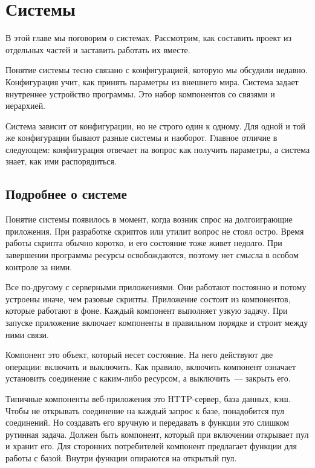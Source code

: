 \chapter{Системы}

\begin{teaser}
В этой главе мы поговорим о системах. Рассмотрим, как составить проект из
отдельных частей и заставить работать их вместе.
\end{teaser}


Понятие системы тесно связано с конфигурацией, которую мы обсудили
недавно. Конфигурация учит, как принять параметры из внешнего мира. Система
задает внутреннее устройство программы. Это набор компонентов со связями и
иерархией.

Система зависит от конфигурации, но не строго один к одному. Для одной и той же
конфигурации бывают разные системы и наоборот. Главное отличие в следующем:
конфигурация отвечает на вопрос как получить параметры, а система знает, как ими
распорядиться.

\section{Подробнее о системе}

Понятие системы появилось в момент, когда возник спрос на долгоиграющие
приложения. При разработке скриптов или утилит вопрос не стоял остро. Время
работы скрипта обычно коротко, и его состояние тоже живет недолго. При
завершении программы ресурсы освобождаются, поэтому нет смысла в особом контроле
за ними.

Все по-другому с серверными приложениями. Они работают постоянно и потому
устроены иначе, чем разовые скрипты. Приложение состоит из компонентов, которые
работают в фоне. Каждый компонент выполняет узкую задачу. При запуске приложение
включает компоненты в правильном порядке и строит между ними связи.

Компонент это объект, который несет состояние. На него действуют две операции:
включить и выключить. Как правило, включить компонент означает установить
соединение с каким-либо ресурсом, а выключить~--- закрыть его.

Типичные компоненты веб-приложения это HTTP-сервер, база данных, кэш. Чтобы не
открывать соединение на каждый запрос к базе, понадобится пул соединений. Но
создавать его вручную и передавать в функции это слишком рутинная задача. Должен
быть компонент, который при включении открывает пул и хранит его. Для сторонних
потребителей компонент предлагает функции для работы с базой. Внутри функции
опираются на открытый пул.

